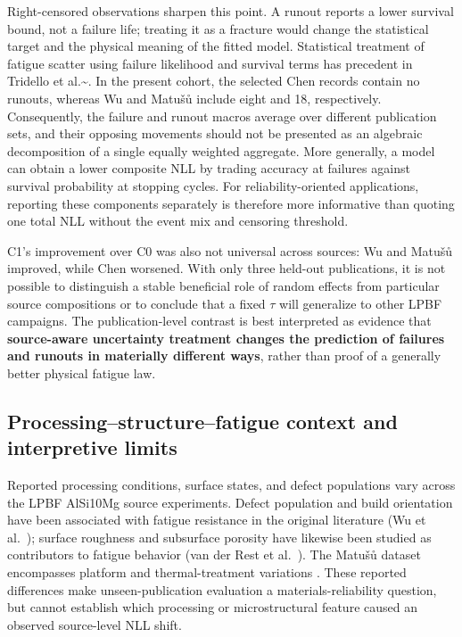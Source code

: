 \documentclass[12pt,a4paper]{article}
\begin{document}
Right-censored observations sharpen this point. A runout reports a lower survival bound, not a failure life; treating it as a fracture would change the statistical target and the physical meaning of the fitted model. Statistical treatment of fatigue scatter using failure likelihood and survival terms has precedent in Tridello et al.\textasciitilde{}\cite{tridello2023a}. In the present cohort, the selected Chen records contain no runouts, whereas Wu and Matušů include eight and 18, respectively. Consequently, the failure and runout macros average over different publication sets, and their opposing movements should not be presented as an algebraic decomposition of a single equally weighted aggregate. More generally, a model can obtain a lower composite NLL by trading accuracy at failures against survival probability at stopping cycles. For reliability-oriented applications, reporting these components separately is therefore more informative than quoting one total NLL without the event mix and censoring threshold.

C1's improvement over C0 was also not universal across sources: Wu and Matušů improved, while Chen worsened. With only three held-out publications, it is not possible to distinguish a stable beneficial role of random effects from particular source compositions or to conclude that a fixed \(\tau\) will generalize to other LPBF campaigns. The publication-level contrast is best interpreted as evidence that \textbf{source-aware uncertainty treatment changes the prediction of failures and runouts in materially different ways}, rather than proof of a generally better physical fatigue law.

\subsection{Processing--structure--fatigue context and interpretive limits}

Reported processing conditions, surface states, and defect populations vary across the LPBF AlSi10Mg source experiments. Defect population and build orientation have been associated with fatigue resistance in the original literature (Wu et al.~\cite{wu2021}); surface roughness and subsurface porosity have likewise been studied as contributors to fatigue behavior (van der Rest et al.~\cite{vanderrest2025}). The Matu\v{s}\r{u} dataset encompasses platform and thermal-treatment variations \cite{matusu2026}. These reported differences make unseen-publication evaluation a materials-reliability question, but cannot establish which processing or microstructural feature caused an observed source-level NLL shift.
\end{document}

